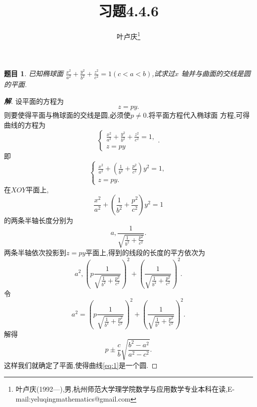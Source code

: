 \documentclass[a4paper]{article}
\newtheorem*{exe}{题目}
\newenvironment{exercise}
{\bigskip\begin{mdframed}\begin{exe}}
    {\end{exe}\end{mdframed}\bigskip}
\begin{document}
\title{\huge{\bf{习题4.4.6}}} \author{\small{叶卢庆\footnote{叶卢庆(1992---),男,杭州师范大学理学院数学与应用数学专业本科在读,E-mail:yeluqingmathematics@gmail.com}}}
\maketitle
\begin{exercise}
  已知椭球面
  $\frac{x^2}{a^2}+\frac{y^2}{b^2}+\frac{z^2}{c^2}=1(c<a<b)$,试求过$x$
  轴并与曲面的交线是圆的平面.
\end{exercise}
\begin{proof}[\textbf{解}]
设平面的方程为
$$
z=py.
$$
则要使得平面与椭球面的交线是圆,必须使$p\neq 0$.将平面方程代入椭球面
方程,可得曲线的方程为
$$
\begin{cases}
  \frac{x^2}{a^2}+\frac{y^2}{b^2}+\frac{z^2}{c^2}=1,\\
z=py
\end{cases}.
$$
即
\begin{equation}\label{eq:1}
\begin{cases}
  \frac{x^2}{a^2}+(\frac{1}{b^2}+\frac{p^2}{c^2})y^2=1,\\
z=py.
\end{cases}
\end{equation}
在$XOY$平面上,
$$
\frac{x^2}{a^2}+(\frac{1}{b^2}+\frac{p^2}{c^2})y^2=1
$$
的两条半轴长度分别为
$$
a,\frac{1}{\sqrt{\frac{1}{b^2}+\frac{p^2}{c^2}}}.
$$
两条半轴依次投影到$z=py$平面上,得到的线段的长度的平方依次为
$$
a^{2},(p\frac{1}{\sqrt{\frac{1}{b^2}+\frac{p^2}{c^2}}})^{2}+(\frac{1}{\sqrt{\frac{1}{b^2}+\frac{p^2}{c^2}}})^{2}.
$$
令
$$
a^{2}=(p\frac{1}{\sqrt{\frac{1}{b^2}+\frac{p^2}{c^2}}})^{2}+(\frac{1}{\sqrt{\frac{1}{b^2}+\frac{p^2}{c^2}}})^{2}.
$$
解得
$$
p\pm \frac{c}{b} \sqrt{\frac{b^2-a^2}{a^2-c^2}}.
$$
这样我们就确定了平面,使得曲线\eqref{eq:1}是一个圆.
\end{proof}
\end{document}
